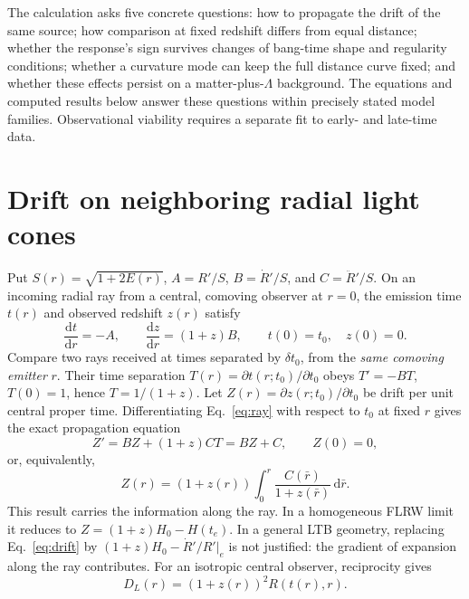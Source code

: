 \documentclass[11pt]{article}
\newcommand{\dd}{\mathrm d}
\newcommand{\D}{D_{\!L}}
\begin{document}
The calculation asks five concrete questions: how to propagate the drift of the same source; how comparison at fixed redshift differs from equal distance; whether the response's sign survives changes of bang-time shape and regularity conditions; whether a curvature mode can keep the full distance curve fixed; and whether these effects persist on a matter-plus-$\Lambda$ background. The equations and computed results below answer these questions within precisely stated model families. Observational viability requires a separate fit to early- and late-time data.

\section{Drift on neighboring radial light cones}
Put $S(r)=\sqrt{1+2E(r)}$, $A=R'/S$, $B=\dot R'/S$, and $C=\ddot R'/S$. On an incoming radial ray from a central, comoving observer at $r=0$, the emission time $t(r)$ and observed redshift $z(r)$ satisfy
\begin{equation}
\frac{\dd t}{\dd r}=-A,\qquad \frac{\dd z}{\dd r}=(1+z)B,\qquad t(0)=t_0,\quad z(0)=0.\label{eq:ray}
\end{equation}
Compare two rays received at times separated by $\delta t_0$, from the \emph{same comoving emitter} $r$. Their time separation $T(r)=\partial t(r;t_0)/\partial t_0$ obeys $T'=-BT$, $T(0)=1$, hence $T=1/(1+z)$. Let $Z(r)=\partial z(r;t_0)/\partial t_0$ be drift per unit central proper time. Differentiating Eq.~\eqref{eq:ray} with respect to $t_0$ at fixed $r$ gives the exact propagation equation
\begin{equation}
Z'=BZ+(1+z)CT=BZ+C,\qquad Z(0)=0,\label{eq:drift}
\end{equation}
or, equivalently,
\begin{equation}
\boxed{\quad Z(r)=(1+z(r))\int_0^r\frac{C(\bar r)}{1+z(\bar r)}\,\dd\bar r.\quad}\label{eq:integral}
\end{equation}
This result carries the information along the ray. In a homogeneous FLRW limit it reduces to $Z=(1+z)H_0-H(t_e)$. In a general LTB geometry, replacing Eq.~\eqref{eq:drift} by $(1+z)H_0-\dot R'/R'|_e$ is not justified: the gradient of expansion along the ray contributes. For an isotropic central observer, reciprocity gives
\begin{equation}
\D(r)=(1+z(r))^2R(t(r),r).\label{eq:distance}
\end{equation}
\end{document}
